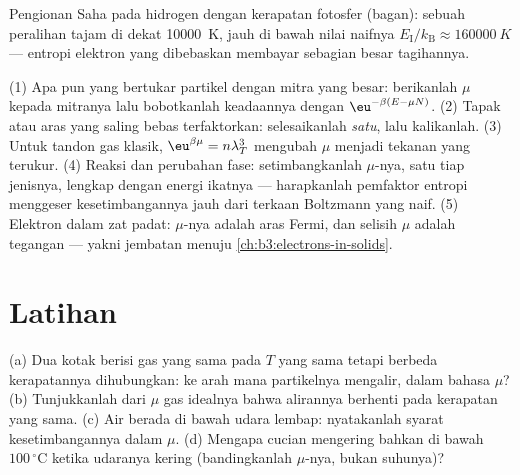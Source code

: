 \begin{omfigure}

{\small Pengionan Saha pada hidrogen dengan kerapatan fotosfer
(bagan): sebuah peralihan tajam di dekat \qty{10000}{K}, jauh di bawah
nilai naifnya $E_{\text{I}}/k_{\text{B}} \approx \qty{160000}{K}$ ---
entropi elektron yang dibebaskan membayar sebagian besar tagihannya.}
\end{omfigure}

\begin{method}\label{met:b3:grand-canonical:method}
(1) Apa pun yang bertukar partikel dengan mitra yang besar: berikanlah
$\mu$ kepada mitranya lalu bobotkanlah keadaannya dengan
$\eu^{-\beta(E - \mu N)}$.
(2) Tapak atau aras yang saling bebas terfaktorkan: selesaikanlah
\emph{satu}, lalu kalikanlah. (3) Untuk tandon gas klasik, $\eu^{\beta\mu} =
n\lambda_T^3$ mengubah $\mu$ menjadi tekanan yang terukur. (4) Reaksi dan perubahan fase: setimbangkanlah $\mu$-nya, satu
tiap jenisnya, lengkap dengan energi ikatnya --- harapkanlah pemfaktor
entropi menggeser kesetimbangannya jauh dari terkaan Boltzmann yang
naif. (5) Elektron dalam zat padat: $\mu$-nya adalah aras Fermi, dan
selisih $\mu$ adalah tegangan --- yakni jembatan menuju
\cref{ch:b3:electrons-in-solids}.
\end{method}

\section{Latihan}

\begin{exercise}[$\star$]\label{exo:b3:grand-canonical:1}
(a) Dua kotak berisi gas yang sama pada $T$ yang sama tetapi berbeda
kerapatannya dihubungkan: ke arah mana partikelnya mengalir, dalam
bahasa $\mu$? (b) Tunjukkanlah dari $\mu$ gas idealnya bahwa alirannya
berhenti pada kerapatan yang sama. (c) Air berada di bawah udara lembap:
nyatakanlah syarat kesetimbangannya dalam $\mu$. (d) Mengapa cucian
mengering bahkan di bawah $100\,^\circ$C ketika udaranya kering
(bandingkanlah $\mu$-nya, bukan suhunya)?
\end{exercise}

